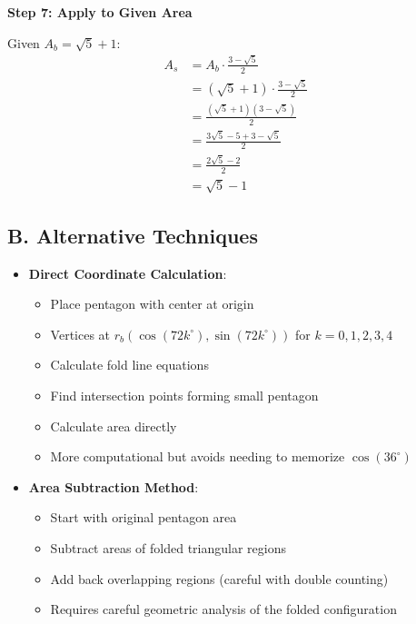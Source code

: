 \documentclass[12pt]{article}
\begin{document}
\begin{techniquesbox}
\begin{itemize}[leftmargin=*]
    \textbf{Step 7: Apply to Given Area}
    
    Given $A_b = \sqrt{5} + 1$:
    \begin{align*}
    A_s &= A_b \cdot \frac{3-\sqrt{5}}{2}\\
    &= (\sqrt{5}+1) \cdot \frac{3-\sqrt{5}}{2}\\
    &= \frac{(\sqrt{5}+1)(3-\sqrt{5})}{2}\\
    &= \frac{3\sqrt{5} - 5 + 3 - \sqrt{5}}{2}\\
    &= \frac{2\sqrt{5} - 2}{2}\\
    &= \sqrt{5} - 1
    \end{align*}
\end{itemize}

\subsection*{B. Alternative Techniques}
\begin{itemize}[leftmargin=*]
    \item \textbf{Direct Coordinate Calculation}:
    \begin{itemize}
        \item Place pentagon with center at origin
        \item Vertices at $r_b(\cos(72k^\circ), \sin(72k^\circ))$ for $k=0,1,2,3,4$
        \item Calculate fold line equations
        \item Find intersection points forming small pentagon
        \item Calculate area directly
        \item More computational but avoids needing to memorize $\cos(36^\circ)$
    \end{itemize}
    
    \item \textbf{Area Subtraction Method}:
    \begin{itemize}
        \item Start with original pentagon area
        \item Subtract areas of folded triangular regions
        \item Add back overlapping regions (careful with double counting)
        \item Requires careful geometric analysis of the folded configuration
    \end{itemize}
\end{itemize}


\end{techniquesbox}
\end{document}
